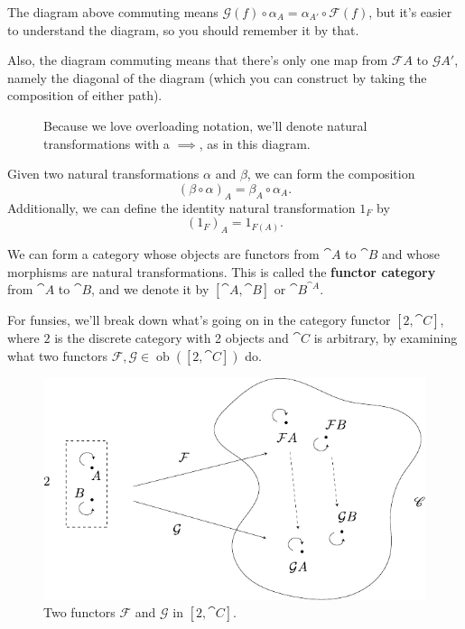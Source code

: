 \documentclass[twoside,10pt]{report}
\DeclareMathOperator{\ob}{ob}
\begin{document}
The diagram above commuting means $\mathcal{G}(f) \circ \alpha_A = \alpha_{A'} \circ \mathcal{F}(f)$, but it's easier to understand the diagram, so you should remember it by that.

Also, the diagram commuting means that there's only one map from $\mathcal{F}A$ to $\mathcal{G}A'$, namely the diagonal of the diagram (which you can construct by taking the composition of either path).

\begin{figure}[H]
	\centering
	\caption{Because we love overloading notation, we'll denote natural transformations with a $\implies$, as in this diagram.}
\end{figure}

Given two natural transformations $\alpha$ and $\beta$, we can form the composition
\[
	(\beta \circ \alpha)_A = \beta_A \circ \alpha_A.
\] Additionally, we can define the identity natural transformation $1_F$ by
\[
	(1_F)_A = 1_{F(A)}.
\] 

\begin{ex}
	We can form a category whose objects are functors from $\cat{A}$ to $\cat{B}$ and whose morphisms are natural transformations. This is called the \textbf{functor category} from $\cat{A}$ to $\cat{B}$, and we denote it by $[\cat{A},\cat{B}]$ or $\cat{B}^{\cat{A}}$.
\end{ex}

	For funsies, we'll break down what's going on in the category functor $[2, \cat{C}]$, where $2$ is the discrete category with 2 objects and $\cat{C}$ is arbitrary, by examining what two functors $\mathcal{F}, \mathcal{G} \in \ob([2, \cat{C}])$ do.

\begin{figure}[H]
	\centering
	\includegraphics[scale=1]{fig/functor-cat.pdf}
	\caption{Two functors $\mathcal{F}$ and $\mathcal{G}$ in $[2,\cat{C}]$.}
\end{figure}
\end{document}
